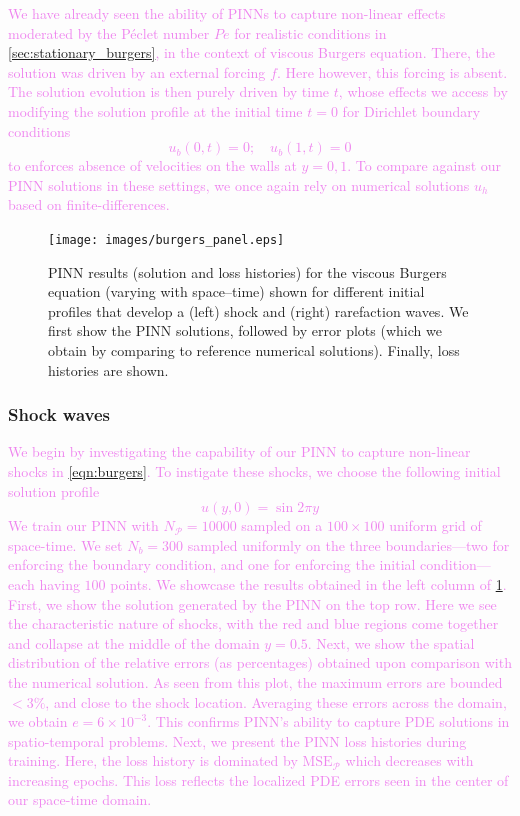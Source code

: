 \documentclass[11pt]{article}
\newcommand{\mse}{\textrm{MSE}}
\newcommand{\pde}{\ensuremath{\mathcal{P}}}
\newcommand{\newcontent}[1]{\textcolor{violet}{#1}}
\begin{document}
\newcontent{
We have already seen the ability of PINNs to capture non-linear
effects moderated by the Péclet number \(Pe\) for realistic
conditions in \cref{sec:stationary_burgers}, in the context of viscous Burgers
equation. There, the solution was driven by an external forcing \(f\). Here
however, this forcing is absent. The solution evolution is then purely driven
by time \(t\), whose effects we access by modifying the solution profile at
the initial time \(t = 0\) for Dirichlet boundary conditions
\[ u_b(0, t) = 0;\quad  u_b(1, t) = 0 \]
to enforces absence of velocities on the walls at \(y = 0, 1\).
To compare against our PINN solutions in these settings, we once again rely
on numerical solutions \({u}_h\) based on finite-differences.
}

\begin{figure}[htbp]
\centering
\texttt{[image: images/burgers\_panel.eps]}
\caption{\label{fig:burgers_results}PINN results (solution and loss histories) for the viscous Burgers equation (varying with space--time) shown for different initial profiles that develop a (left) shock and (right) rarefaction waves. We first show the PINN solutions, followed by error plots (which we obtain by comparing to reference numerical solutions). Finally, loss histories are shown.}
\end{figure}

\subsubsection{Shock waves}
\label{sec:orgf5a9f62}
\newcontent{
We begin by investigating the capability of our PINN to capture non-linear shocks in
\cref{eqn:burgers}. To instigate these shocks, we
choose the following initial solution profile
\[ u(y, 0) = \sin{2 \pi y}\]
}
\newcontent{
We train our PINN with \(N_\pde = 10000\) sampled on a \(100 \times 100\) uniform
grid of space-time. We set \(N_b = 300\) sampled uniformly on
the three boundaries---two for enforcing the boundary condition, and one for
enforcing the initial condition---each having \(100\) points. We showcase
the results obtained
in the left column of \cref{fig:burgers_results}. First, we show the
solution generated by the PINN on the top row. Here we see the
characteristic nature of shocks, with the red and blue regions come together
and collapse at the middle of the domain \(y = 0.5\). Next, we show the spatial
distribution of the relative errors (as percentages) obtained upon
comparison with the numerical solution. As
seen from this plot, the maximum errors are bounded \(< 3\%\), and close to
the shock location. Averaging these errors across the domain, we obtain \(e = 6 \times 10^{-3}\).
This confirms PINN's ability to capture PDE solutions in spatio-temporal
problems. Next, we present the PINN loss histories
during training.
Here, the loss history is dominated by \(\mse_\pde\) which decreases with
increasing epochs. This loss reflects the localized PDE errors seen in the
center of our space-time domain.
}
\end{document}
